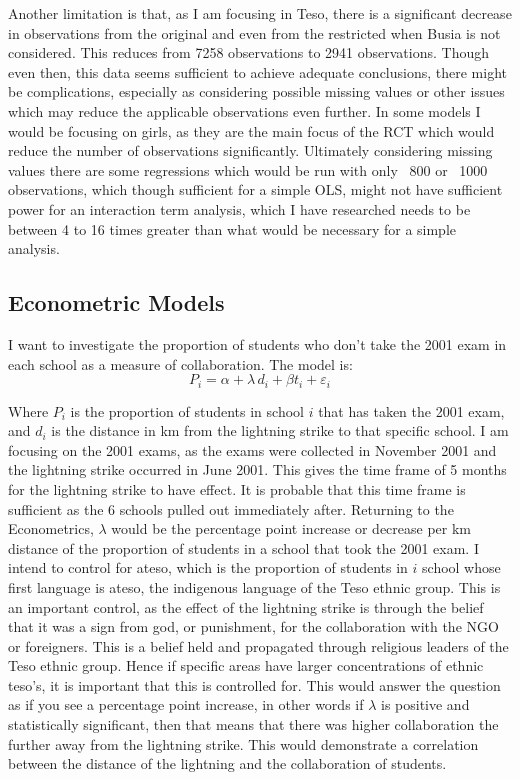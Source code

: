 \documentclass{article}
\begin{document}
	Another limitation is that, as I am focusing in Teso, there is a significant decrease in observations from the original and even from the restricted when Busia is not considered. This reduces from 7258 observations to 2941 observations. Though even then, this data seems sufficient to achieve adequate conclusions, there might be complications, especially as considering possible missing values or other issues which may reduce the applicable observations even further. In some models I would be focusing on girls, as they are the main focus of the RCT which would reduce the number of observations significantly. Ultimately considering missing values there are some regressions which would be run with only ~800 or ~1000 observations, which though sufficient for a simple OLS, might not have sufficient power for an interaction term analysis, which I have researched needs to be between 4 to 16 times greater than what would be necessary for a simple analysis. \autocites{gelman-2018-need16}

\subsection{Econometric Models}
I want to investigate the proportion of students who don't take the 2001 exam in each school as a measure of collaboration. The model is: \[
P_i = \alpha + \lambda\, d_i + \beta t_i + \varepsilon_i
\]

Where $P_i$ is the proportion of students in school $i$ that has taken the 2001 exam, and $d_i$ is the distance in km from the lightning strike to that specific school. I am focusing on the 2001 exams, as the exams were collected in November 2001 and the lightning strike occurred in June 2001. This gives the time frame of 5 months for the lightning strike to have effect. It is probable that this time frame is sufficient as the 6 schools pulled out immediately after. Returning to the Econometrics, $\lambda$ would be the percentage point increase or decrease per km distance of the proportion of students in a school that took the 2001 exam. I intend to control for ateso, which is the proportion of students in $i$ school whose first language is ateso, the indigenous language of the Teso ethnic group. This is an important control, as the effect of the lightning strike is through the belief that it was a sign from god, or punishment, for the collaboration with the NGO or foreigners. This is a belief held and propagated through religious leaders of the Teso ethnic group. Hence if specific areas have larger concentrations of ethnic teso's, it is important that this is controlled for. This would answer the question as if you see a percentage point increase, in other words if $\lambda$ is positive and statistically significant, then that means that there was higher collaboration the further away from the lightning strike. This would demonstrate a correlation between the distance of the lightning and the collaboration of students. 
\end{document}

